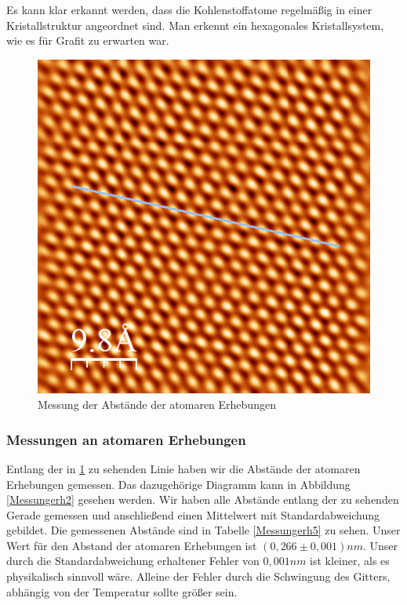 \documentclass[10pt,a4paper]{article}
\begin{document}
Es kann klar erkannt werden, dass die Kohlenstoffatome regelmäßig in einer Kristallstruktur angeordnet sind. Man erkennt ein hexagonales Kristallsystem, wie es für Grafit zu erwarten war.

\begin{figure}[h]
	\centering

	\includegraphics[scale = 0.6]{Aufnahme_Ebene_doppelte_fourier2.png}

	\caption{Messung der Abstände der atomaren Erhebungen}
	\label{Messungerh1}
\end{figure}

\subsubsection{Messungen an atomaren Erhebungen}

Entlang der in \ref{Messungerh1} zu sehenden Linie haben wir die Abstände der atomaren Erhebungen gemessen. Das dazugehörige Diagramm kann in Abbildung \ref{Messungerh2} gesehen werden. Wir haben alle Abstände entlang der zu sehenden Gerade gemessen und anschließend einen Mittelwert mit Standardabweichung gebildet. Die gemessenen Abstände sind in Tabelle \ref{Messungerh5} zu sehen. Unser Wert für den Abstand der atomaren Erhebungen ist $(0,266 \pm 0,001) nm$. Unser durch die Standardabweichung erhaltener Fehler von $0,001 nm$ ist kleiner, als es physikalisch sinnvoll wäre. Alleine der Fehler durch die Schwingung des Gitters, abhängig von der Temperatur sollte größer sein.
\end{document}
